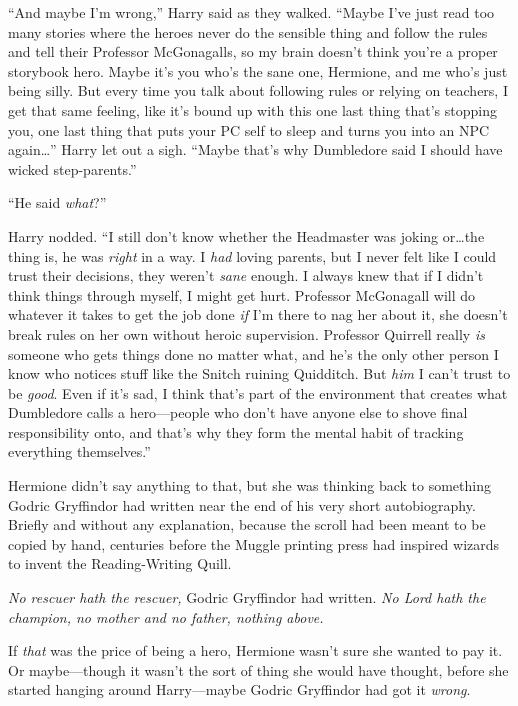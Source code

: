 “And maybe I’m wrong,” Harry said as they walked.
“Maybe I’ve just read too many stories where the heroes never do the sensible thing and follow the rules and tell their Professor McGonagalls, so my brain doesn’t think you’re a proper storybook hero. Maybe it’s you who’s the sane one, Hermione, and me who’s just being silly. But every time you talk about following rules or relying on teachers, I get that same feeling, like it’s bound up with this one last thing that’s stopping you, one last thing that puts your PC self to sleep and turns you into an NPC again…” Harry let out a sigh.
“Maybe that’s why Dumbledore said I should have wicked step-parents.”

“He said \emph{what}?”

Harry nodded.
“I still don’t know whether the Headmaster was joking or…the thing is, he was \emph{right} in a way. I \emph{had} loving parents, but I never felt like I could trust their decisions, they weren’t \emph{sane} enough. I always knew that if I didn’t think things through myself, I might get hurt. Professor McGonagall will do whatever it takes to get the job done \emph{if} I’m there to nag her about it, she doesn’t break rules on her own without heroic supervision. Professor Quirrell really \emph{is} someone who gets things done no matter what, and he’s the only other person I know who notices stuff like the Snitch ruining Quidditch. But \emph{him} I can’t trust to be \emph{good}. Even if it’s sad, I think that’s part of the environment that creates what Dumbledore calls a hero—people who don’t have anyone else to shove final responsibility onto, and that’s why they form the mental habit of tracking everything themselves.”

Hermione didn’t say anything to that, but she was thinking back to something Godric Gryffindor had written near the end of his very short autobiography. Briefly and without any explanation, because the scroll had been meant to be copied by hand, centuries before the Muggle printing press had inspired wizards to invent the Reading-Writing Quill.

\emph{No rescuer hath the rescuer,} Godric Gryffindor had written. \emph{No Lord hath the champion, no mother and no father, nothing above.}

If \emph{that} was the price of being a hero, Hermione wasn’t sure she wanted to pay it. Or maybe—though it wasn’t the sort of thing she would have thought, before she started hanging around Harry—maybe Godric Gryffindor had got it \emph{wrong}.


